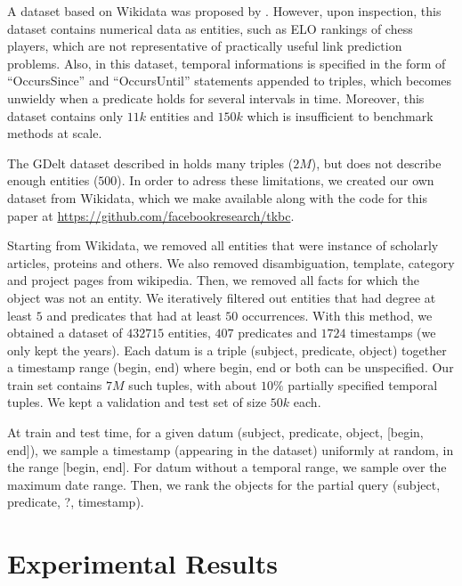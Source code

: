 \documentclass{article}
\begin{document}
A dataset based on Wikidata was proposed by \citet{garcia2018learning}. However, upon inspection, this dataset contains numerical data as entities, such as ELO rankings of chess players, which are not representative of practically useful link prediction problems. 
Also, in this dataset, temporal informations is specified in the form of ``OccursSince'' and ``OccursUntil'' statements appended to triples, which becomes unwieldy when a predicate holds for several intervals in time. Moreover, this dataset contains only $11k$ entities and $150k$ which is insufficient to benchmark methods at scale.

The GDelt dataset described in \citet{ma2018embedding, goel2019diachronic} holds many triples ($2M$), but does not describe enough entities ($500$). In order to adress these limitations, we created our own dataset from Wikidata, which we make available along with the code for this paper at \url{https://github.com/facebookresearch/tkbc}.


Starting from Wikidata, we removed all entities that were instance of scholarly articles, proteins and others. We also removed disambiguation, template, category and project pages from wikipedia. Then, we removed all facts for which the object was not an entity. We iteratively filtered out entities that had degree at least $5$ and predicates that had at least $50$ occurrences. With this method, we obtained a dataset of $432715$ entities, $407$ predicates and $1724$ timestamps (we only kept the years). Each datum is a triple (subject, predicate, object) together a timestamp range (begin, end) where begin, end or both can be unspecified. Our train set contains $7M$ such tuples, with about $10\%$ partially specified temporal tuples. We kept a validation and test set of size $50k$ each.

At train and test time, for a given datum (subject, predicate, object, [begin, end]), we sample a timestamp (appearing in the dataset) uniformly at random, in the range [begin, end]. For datum without a temporal range, we sample over the maximum date range. Then, we rank the objects for the partial query (subject, predicate, ?, timestamp).

\section{Experimental Results}
\end{document}
